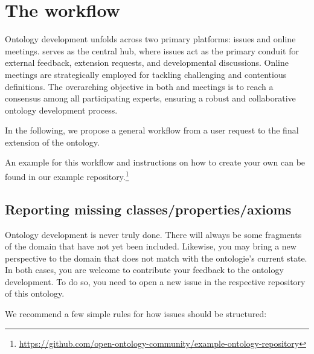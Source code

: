 \section{The {\github} workflow}

Ontology development unfolds across two primary platforms: {\github} issues and online meetings. {\github}  serves as the central hub, where issues act as the primary conduit for external feedback, extension requests, and developmental discussions. Online meetings are strategically employed for tackling challenging and contentious definitions. The overarching objective in both {\github}  and meetings is to reach a consensus among all participating experts, ensuring a robust and collaborative ontology development process.

In the following, we propose a general workflow from a user request to the final extension of the ontology.

An example for this workflow and instructions on how to create your own can be found in our example repository.\footnote{\url{https://github.com/open-ontology-community/example-ontology-repository}}

\subsection{Reporting missing classes/properties/axioms}


Ontology development is never truly done. There will always be some fragments of the domain that have not yet been included. Likewise, you may bring a new perspective to the domain that does not match with the ontologie's current state. In both cases, you are welcome to contribute your feedback to the ontology development. To do so, you need to open a new issue in the respective {\github} repository of this ontology. 

We recommend a few simple rules for how issues should be structured:

